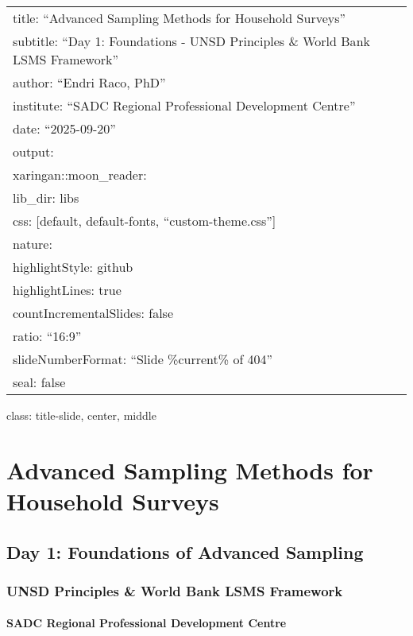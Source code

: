 \documentclass[
]{article}
\author{}
\date{\vspace{-2.5em}}
\begin{document}
\begin{longtable}[]{@{}l@{}}
\toprule\noalign{}
\endhead
\bottomrule\noalign{}
\endlastfoot
title: ``Advanced Sampling Methods for Household Surveys'' \\
subtitle: ``Day 1: Foundations - UNSD Principles \& World Bank LSMS
Framework'' \\
author: ``Endri Raco, PhD'' \\
institute: ``SADC Regional Professional Development Centre'' \\
date: ``2025-09-20'' \\
output: \\
xaringan::moon\_reader: \\
lib\_dir: libs \\
css: {[}default, default-fonts, ``custom-theme.css''{]} \\
nature: \\
highlightStyle: github \\
highlightLines: true \\
countIncrementalSlides: false \\
ratio: ``16:9'' \\
slideNumberFormat: ``Slide \%current\% of 404'' \\
seal: false \\
\end{longtable}

class: title-slide, center, middle

\section{Advanced Sampling Methods for Household
Surveys}\label{advanced-sampling-methods-for-household-surveys}

\subsection{Day 1: Foundations of Advanced
Sampling}\label{day-1-foundations-of-advanced-sampling}

\subsubsection{UNSD Principles \& World Bank LSMS
Framework}\label{unsd-principles-world-bank-lsms-framework}

\paragraph{SADC Regional Professional Development
Centre}\label{sadc-regional-professional-development-centre}
\end{document}
